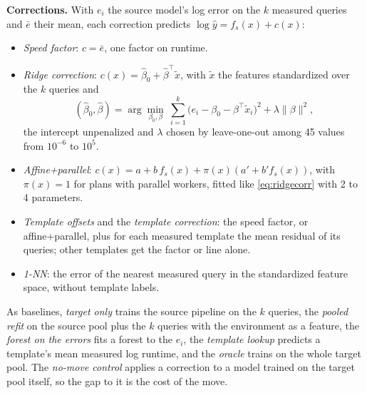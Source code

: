 \documentclass{article}
\begin{document}
\textbf{Corrections.} With $e_i$ the source model's log error on the $k$ measured queries and $\bar e$ their mean, each correction predicts $\log\hat y=f_s(x)+c(x)$:
\begin{itemize}[leftmargin=*,itemsep=0pt,topsep=2pt]
\item \emph{Speed factor}: $c=\bar e$, one factor on runtime.
\item \emph{Ridge correction}: $c(x)=\hat\beta_0+\hat\beta^\top\tilde x$, with $\tilde x$ the features standardized over the $k$ queries and
\begin{equation}
(\hat\beta_0,\hat\beta)=\arg\min_{\beta_0,\beta}\ \textstyle\sum_{i=1}^k\bigl(e_i-\beta_0-\beta^\top\tilde x_i\bigr)^2+\lambda\|\beta\|^2,
\label{eq:ridgecorr}
\end{equation}
the intercept unpenalized and $\lambda$ chosen by leave-one-out \parencite{golub1979} among 45 values from $10^{-6}$ to $10^{5}$.
\item \emph{Affine+parallel}: $c(x)=a+b\,f_s(x)+\pi(x)(a'+b'f_s(x))$, with $\pi(x)=1$ for plans with parallel workers, fitted like \eqref{eq:ridgecorr} with 2 to 4 parameters.
\item \emph{Template offsets} and the \emph{template correction}: the speed factor, or affine+parallel, plus for each measured template the mean residual of its queries; other templates get the factor or line alone.
\item \emph{1-NN}: the error of the nearest measured query in the standardized feature space, without template labels.
\end{itemize}
As baselines, \emph{target only} trains the source pipeline on the $k$ queries, the \emph{pooled refit} on the source pool plus the $k$ queries with the environment as a feature, the \emph{forest on the errors} fits a forest to the $e_i$, the \emph{template lookup} predicts a template's mean measured log runtime, and the \emph{oracle} trains on the whole target pool. The \emph{no-move control} applies a correction to a model trained on the target pool itself, so the gap to it is the cost of the move.
\end{document}
